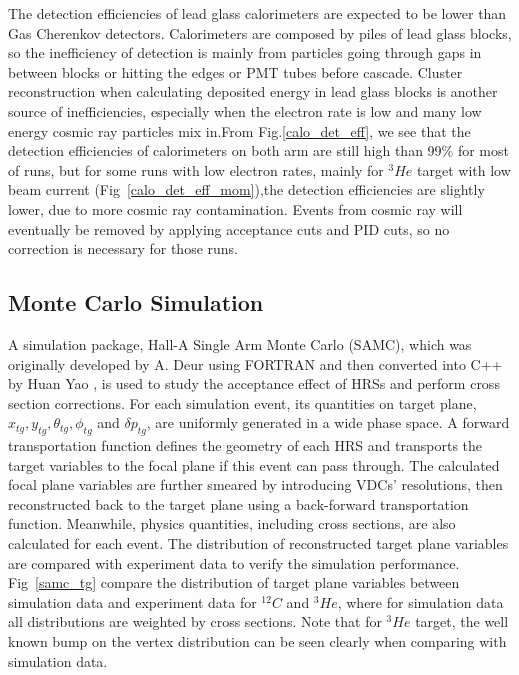 \documentclass[a4paper,18.pt]{article}
\begin{document}
 The detection efficiencies of lead glass calorimeters are expected to be lower than Gas Cherenkov detectors. Calorimeters are composed by piles of lead glass blocks, so the inefficiency of detection is mainly from particles going through gaps in between blocks or hitting the edges or PMT tubes before cascade. Cluster reconstruction when calculating deposited energy in lead glass blocks is another source of inefficiencies, especially when the electron rate is low and many low energy cosmic ray particles mix in.From Fig.\ref{calo_det_eff}, we see that the detection efficiencies of calorimeters on both arm are still high than 99\% for most of runs, but for some runs with low electron rates, mainly for $^{3}He$ target with low beam current (Fig~\ref{calo_det_eff_mom}),the detection efficiencies are slightly lower, due to more cosmic ray contamination. Events from cosmic ray will eventually be removed by applying acceptance cuts and PID cuts, so no correction is necessary for those runs.  


\subsection{Monte Carlo Simulation}

A simulation package, Hall-A Single Arm Monte Carlo (SAMC), which was originally developed by A. Deur \cite{} using FORTRAN and then converted into C++ by Huan Yao \cite{}, is used to study the acceptance effect of HRSs and perform cross section corrections. For each simulation event, its quantities on target plane, $x_{tg},y_{tg}, \theta_{tg}, \phi_{tg}$ and $\delta p_{tg}$, are uniformly generated in a wide phase space. A forward transportation function defines the  geometry of each HRS and transports the target variables to the focal plane if this event can pass through. The calculated focal plane variables are further smeared by introducing VDCs' resolutions, then reconstructed back to the target plane using a back-forward transportation function. Meanwhile, physics quantities, including cross sections, are also calculated for each event. The distribution of reconstructed target plane variables are compared with experiment data to verify the simulation performance. Fig~\ref{samc_tg} compare the distribution of target plane variables between simulation data and experiment data for $^{12}C$ and $^{3}He$, where for simulation data all distributions are weighted by cross sections. Note that for $^{3}He$ target, the well known bump on the vertex distribution can be seen clearly when comparing with simulation data.
\end{document}
